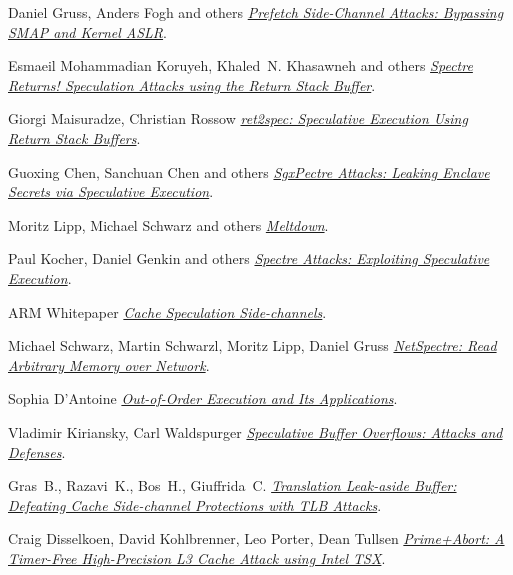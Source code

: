 \begin{frame}[allowframebreaks]
\begin{thebibliography}{10}
    Daniel Gruss, Anders Fogh and others
    \newblock \href{https://gruss.cc/files/prefetch.pdf}{\em Prefetch Side-Channel Attacks: Bypassing SMAP and Kernel ASLR}.

    Esmaeil Mohammadian Koruyeh, Khaled~N. Khasawneh and others
    \newblock \href{https://arxiv.org/abs/1807.07940}{\em Spectre Returns! Speculation Attacks using the Return Stack Buffer}.

    Giorgi Maisuradze, Christian Rossow
    \newblock \href{https://christian-rossow.de/publications/ret2spec-ccs2018.pdf}{\em ret2spec: Speculative Execution Using Return Stack Buffers}.

    Guoxing Chen, Sanchuan Chen and others
    \newblock \href{https://arxiv.org/abs/1802.09085}{\em SgxPectre Attacks: Leaking Enclave Secrets via Speculative Execution}.

    Moritz Lipp, Michael Schwarz and others
    \newblock \href{https://meltdownattack.com/meltdown.pdf}{\em Meltdown}.

    Paul Kocher, Daniel Genkin and others
    \newblock \href{https://spectreattack.com/spectre.pdf}{\em Spectre Attacks: Exploiting Speculative Execution}.

    ARM Whitepaper
    \newblock \href{https://developer.arm.com/support/security-update/download-the-whitepaper}{\em Cache Speculation Side-channels}.

    Michael Schwarz, Martin Schwarzl, Moritz Lipp, Daniel Gruss
    \newblock \href{https://misc0110.net/web/files/netspectre.pdf}{\em NetSpectre: Read Arbitrary Memory over Network}.

    Sophia D'Antoine
    \newblock \href{https://deepsec.net/docs/Slides/2017/Out-Of-Order_Execution_and_its_applications_Sophia_dAntoine.pdf}{\em Out-of-Order Execution and Its Applications}.

    Vladimir Kiriansky, Carl Waldspurger
    \newblock \href{https://people.csail.mit.edu/vlk/spectre11.pdf}{\em Speculative Buffer Overflows: Attacks and Defenses}.

    Gras~B., Razavi~K., Bos~H., Giuffrida~C.
    \newblock \href{https://www.vusec.net/projects/tlbleed/}{\em Translation Leak-aside Buffer: Defeating Cache Side-channel Protections with TLB Attacks}.

    Craig Disselkoen, David Kohlbrenner, Leo Porter, Dean Tullsen
    \newblock \href{https://www.usenix.org/conference/usenixsecurity17/technical-sessions/presentation/disselkoen}{\em Prime+Abort: A Timer-Free High-Precision L3 Cache Attack using Intel TSX}.


\end{thebibliography}
\end{frame}

